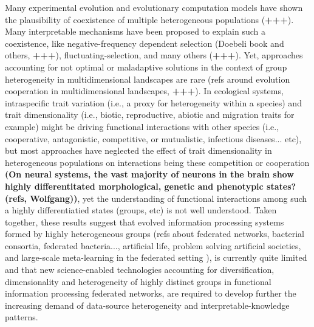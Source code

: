 \documentclass[11pt, a4paper]{article} %
\begin{document}
Many experimental evolution and evolutionary computation models have
shown the plausibility of coexistence of multiple heterogeneous
populations ({\bf +++}). Many interpretable mechanisms have been
proposed to explain such a coexistence, like negative-frequency
dependent selection (Doebeli book and others, {\bf +++}),
fluctuating-selection, and many others ({\bf +++}). Yet, approaches
accounting for not optimal or maladaptive solutions in the context of
group heterogeneity in multidimensional landscapes are rare (refs
around evolution cooperation in multidimensional landscapes, {\bf
  +++}). In ecological systems, intraspecific trait variation (i.e., a
proxy for heterogeneity within a species) and trait dimensionality
(i.e., biotic, reproductive, abiotic and migration traits for example)
might be driving functional interactions with other species (i.e.,
cooperative, antagonistic, competitive, or mutualistic, infectious
diseases... etc), but most approaches have neglected the effect of
trait dimensionality in heterogeneous populations on interactions
being these competition or cooperation {\bf (On neural systems, the
  vast majority of neurons in the brain show highly differentitated
  morphological, genetic and phenotypic states? (refs, Wolfgang))},
yet the understanding of functional interactions among such a highly
differentiatied states (groups, etc) is not well understood. Taken
together, these results suggest that evolved information processing
systems formed by highly heterogeneous groups (refs about federated
networks, bacterial consortia, federated bacteria..., artificial life,
problem solving artificial societies, and large-scale meta-learning in
the federated setting \citep{Dilley2016}), is currently quite limited
and that new science-enabled technologies accounting for
diversification, dimensionality and heterogeneity of highly distinct
groups in functional information processing federated networks, are
required to develop further the increasing demand of data-source
heterogeneity and interpretable-knowledge patterns.
\end{document}
